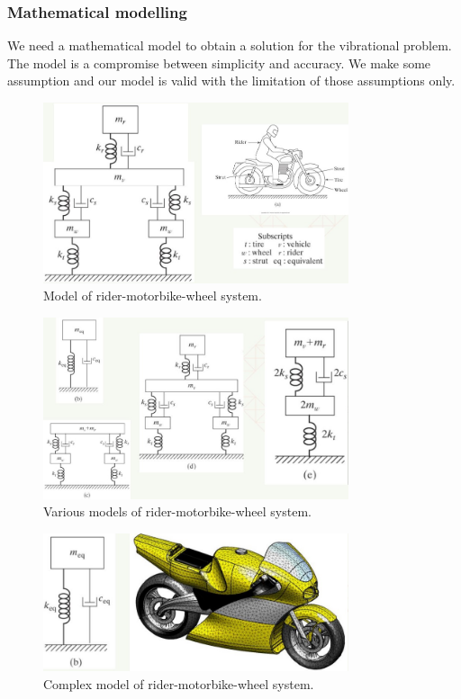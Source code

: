 \documentclass[class=report, crop=false, 12pt,a4paper]{standalone}
\begin{document}
\subsubsection{Mathematical modelling}
We need a mathematical model to obtain a solution for the vibrational problem. The model is a compromise between simplicity and accuracy. We make some assumption and our model is valid with the limitation of those assumptions only. 
\begin{figure}[H]
    \centering
    \includegraphics[width = 0.8\textwidth]{../img/diagram7.jpg}
    \caption{Model of rider-motorbike-wheel system.}
\end{figure}
\begin{figure}[H]
    \centering
    \includegraphics[width = 0.8\textwidth]{../img/diagram8.jpg}
    \caption{Various models of rider-motorbike-wheel system.}
\end{figure}
\begin{figure}[H]
    \centering
    \includegraphics[width = 0.8\textwidth]{../img/diagram9.jpg}
    \caption{Complex model of rider-motorbike-wheel system.}
\end{figure}
\end{document}
